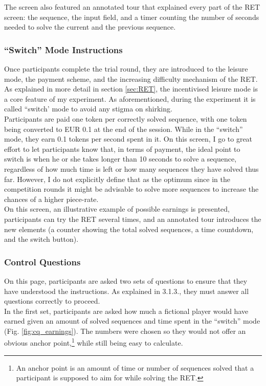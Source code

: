     The screen also featured an annotated tour that explained every part of the RET screen: the sequence, the input field, and a timer counting the number of seconds needed to solve the current and the previous sequence.
    
    \subsubsection{``Switch'' Mode Instructions}
    
    Once participants complete the trial round, they are introduced to the leisure mode, the payment scheme, and the increasing difficulty mechanism of the RET. As explained in more detail in section \ref{sec:RET}, the incentivised leisure mode is a core feature of my experiment. As aforementioned, during the experiment it is called ``switch' mode to avoid any stigma on shirking.\\
    
    Participants are paid one token per correctly solved sequence, with one token being converted to EUR 0.1 at the end of the session. While in the ``switch'' mode, they earn 0.1 tokens per second spent in it. On this screen, I go to great effort to let participants know that, in terms of payment, the ideal point to switch is when he or she takes longer than 10 seconds to solve a sequence, regardless of how much time is left or how many sequences they have solved thus far. However, I do not explicitly define that as the optimum since in the competition rounds it might be advisable to solve more sequences to increase the chances of a higher piece-rate.\\
    
    On this screen, an illustrative example of possible earnings is presented, participants can try the RET several times, and an annotated tour introduces the new elements (a counter showing the total solved sequences, a time countdown, and the switch button).
    
    \subsubsection{Control Questions}
    
    On this page, participants are asked two sets of questions to ensure that they have understood the instructions. As explained in 3.1.3., they must answer all questions correctly to proceed.\\
    
    In the first set, participants are asked how much a fictional player would have earned given an amount of solved sequences and time spent in the ``switch'' mode (Fig. \ref{fig:cq_earnings}). The numbers were chosen so they would not offer an obvious anchor point,\footnote{An anchor point is an amount of time or number of sequences solved that a participant is supposed to aim for while solving the RET.} while still being easy to calculate.\\
    
